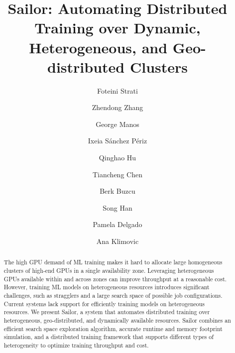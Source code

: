 \documentclass[sigplan,screen]{acmart}
\newcommand{\sailor}{{Sailor}\xspace}
\begin{document}
\title[\sailor: Automating Distributed Training over Dynamic, \\ Heterogeneous, and Geo-distributed Clusters]{\sailor: Automating Distributed Training over Dynamic, Heterogeneous, and Geo-distributed Clusters}

\author{Foteini Strati}


\author{Zhendong Zhang}


\author{George Manos}


\author{Ixeia Sánchez Périz}
\affiliation{%
  \institution{}
  \country{}
}

\author{Qinghao Hu}

\author{Tiancheng Chen}

\author{Berk Buzcu}

\author{Song Han}

\author{Pamela Delgado}

\author{Ana Klimovic}

\renewcommand{\shortauthors}{Strati, et al.}

\begin{abstract}
The high GPU demand of ML training makes it hard to allocate large homogeneous clusters of high-end GPUs in a single availability zone. Leveraging  heterogeneous GPUs available within and across zones can improve throughput at a reasonable cost. However, training ML models on heterogeneous resources introduces significant challenges, such as stragglers and a large search space of possible job configurations. Current systems lack support for efficiently training models on heterogeneous resources. We present \sailor, a system that automates distributed training over heterogeneous, geo-distributed, and dynamically available resources. \sailor combines an efficient search space exploration algorithm, accurate runtime and memory footprint simulation, and a distributed training framework that supports different types of heterogeneity to optimize training throughput and cost.
\end{abstract}
\end{document}
